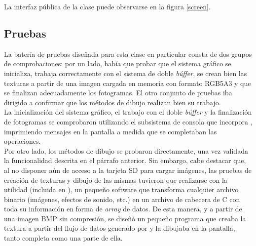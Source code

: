 La interfaz pública de la clase puede observarse en la figura \ref{screen}.\\


\subsection{Pruebas}

La batería de pruebas diseñada para esta clase en particular consta de dos grupos de comprobaciones: por un lado, había que probar que el sistema gráfico se inicializa, trabaja correctamente con el sistema de doble \emph{búffer}, se crean bien las texturas a partir de una imagen cargada en memoria con formato RGB5A3 y que se finalizan adecuadamente los fotogramas. El otro conjunto de pruebas iba dirigido a confirmar que los métodos de dibujo realizan bien su trabajo.\\

La inicialización del sistema gráfico, el trabajo con el doble \emph{búffer} y la finalización de fotogramas se comprobaron utilizando el subsistema de consola que incorpora , imprimiendo mensajes en la pantalla a medida que se completaban las operaciones.\\

Por otro lado, los métodos de dibujo se probaron directamente, una vez validada la funcionalidad descrita en el párrafo anterior. Sin embargo, cabe destacar que, al no disponer aún de acceso a la tarjeta SD para cargar imágenes, las pruebas de creación de texturas y dibujo de las mismas tuvieron que realizarse con la utilidad  (incluida en  \cite{website:devkitpro}), un pequeño software que transforma cualquier archivo binario (imágenes, efectos de sonido, etc.) en un archivo de cabecera de C con toda su información en forma de \emph{array} de datos. De esta manera, y a partir de una imagen BMP sin compresión, se diseñó un pequeño programa que creaba la textura a partir del flujo de datos generado por  y la dibujaba en la pantalla, tanto completa como una parte de ella.

